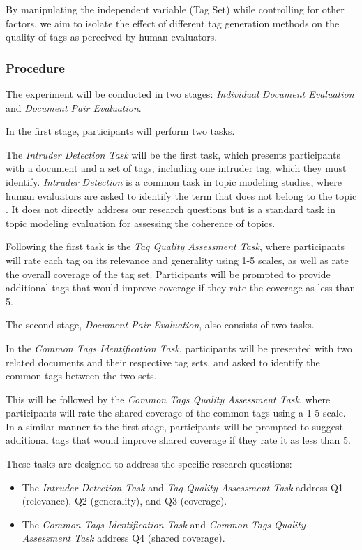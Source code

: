 By manipulating the independent variable (Tag Set) while controlling for other factors, we aim to isolate the effect of different tag generation methods on the quality of tags as perceived by human evaluators.

\subsubsection{Procedure}
The experiment will be conducted in two stages: \textit{Individual Document Evaluation} and \textit{Document Pair Evaluation}.

In the first stage, participants will perform two tasks.

The \textit{Intruder Detection Task} will be the first task, which presents participants with a document and a set of tags, including one intruder tag, which they must identify. \textit{Intruder Detection} is a common task in topic modeling studies, where human evaluators are asked to identify the term that does not belong to the topic \cite{chang_reading_2009, newman_evaluating_2010, musil_exploring_2024, lau_machine_2014, bhatia_automatic_2017, hoyle_is_2021}. It does not directly address our research questions but is a standard task in topic modeling evaluation for assessing the coherence of topics.

Following the first task is the \textit{Tag Quality Assessment Task}, where participants will rate each tag on its relevance and generality using 1-5 scales, as well as rate the overall coverage of the tag set. Participants will be prompted to provide additional tags that would improve coverage if they rate the coverage as less than 5.

The second stage, \textit{Document Pair Evaluation}, also consists of two tasks.

In the \textit{Common Tags Identification Task}, participants will be presented with two related documents and their respective tag sets, and asked to identify the common tags between the two sets.

This will be followed by the \textit{Common Tags Quality Assessment Task}, where participants will rate the shared coverage of the common tags using a 1-5 scale. In a similar manner to the first stage, participants will be prompted to suggest additional tags that would improve shared coverage if they rate it as less than 5.

These tasks are designed to address the specific research questions:
\begin{itemize}
\item The \textit{Intruder Detection Task} and \textit{Tag Quality Assessment Task} address Q1 (relevance), Q2 (generality), and Q3 (coverage).
\item The \textit{Common Tags Identification Task} and \textit{Common Tags Quality Assessment Task} address Q4 (shared coverage).
\end{itemize}

